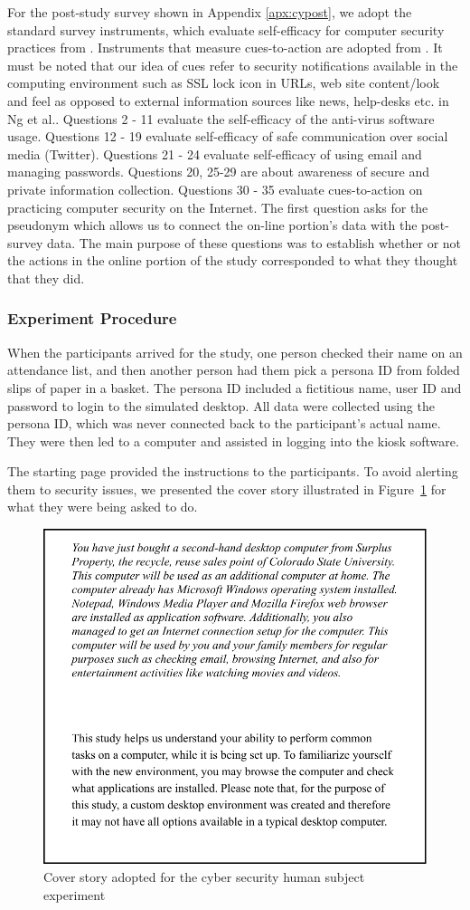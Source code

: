 For the post-study survey shown in Appendix \ref{apx:cypost}, we adopt the standard survey instruments, which evaluate self-efficacy for computer security practices from \cite{ng2007, compeau1995}. Instruments that measure cues-to-action are adopted from \cite{ng2007}. It must be noted that our idea of cues refer to security notifications available in the computing environment such as SSL lock icon in URLs, web site content/look and feel as opposed to external information sources like news, help-desks etc. in Ng et al.\citeyear{ng2007}. Questions 2 - 11 evaluate the self-efficacy of the anti-virus software usage. Questions 12 - 19 evaluate self-efficacy of safe communication over social media (Twitter). Questions 21 - 24 evaluate self-efficacy of using email and managing passwords. Questions 20, 25-29 are about awareness of secure and private information collection. Questions 30 - 35 evaluate cues-to-action on practicing computer security on the Internet. The first question asks for the pseudonym which allows us to connect the on-line portion's data with the post-survey data. The main purpose of these questions was to establish whether or not the actions in the online portion of the study corresponded to what they thought that they did.


\subsubsection*{Experiment Procedure}
When the participants arrived for the study, one person checked their name on an attendance list, and then another person had them pick a persona ID from folded slips of paper in a basket. The persona ID included a fictitious name, user ID and password to login to the simulated desktop. All data were collected using the persona ID, which was never connected back to the participant's actual name. They were then led to a computer and assisted in logging into the kiosk software.

The starting page provided the instructions to the participants. To avoid alerting them to security issues, we presented the cover story illustrated in Figure~\ref{fig:cybercover} for what they were being asked to do.

\begin{figure}[tpb]
  \centering
  \includegraphics[width=0.7\columnwidth]{img/cybercover.pdf}
  \caption{Cover story adopted for the cyber security human subject experiment}
  \label{fig:cybercover}
\end{figure}


